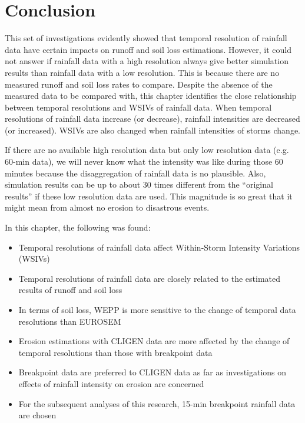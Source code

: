 \section{Conclusion}
\label{sec:TemporalScalesConclusion}

This set of investigations evidently showed that temporal resolution of rainfall
data have certain impacts on runoff and soil loss estimations. However, it could
not answer if rainfall data with a high resolution always give better simulation
results than rainfall data with a low resolution. This is because there are
no measured runoff and soil loss rates to compare. Despite the absence of the
measured data to be compared with, this chapter identifies the close
relationship between temporal resolutions and WSIVs of rainfall data. When
temporal resolutions of rainfall data increase (or decrease), rainfall
intensities are decreased (or increased). WSIVs are also changed when rainfall
intensities of storms change.

If there are no available high resolution data but only low resolution
data (e.g. 60-min data), we will never know what the intensity was like
during those 60 minutes because the disaggregation of rainfall data is no
plausible. Also, simulation results can be up to about 30 times different from
the ``original results'' if these low resolution data are used. This magnitude
is so great that it might mean from almost no erosion to disastrous events.

In this chapter, the following was found:
\begin{itemize}
  \item Temporal resolutions of rainfall data affect Within-Storm Intensity
Variations (WSIVs)
  \item Temporal resolutions of rainfall data are closely related to the
estimated
results of runoff and soil loss
  \item In terms of soil loss, WEPP is more sensitive to the change of temporal
data resolutions than EUROSEM
  \item Erosion estimations with CLIGEN data are more affected by the change of
temporal resolutions than those with breakpoint data
  \item Breakpoint data are preferred to CLIGEN data as far as investigations
on effects of rainfall intensity on erosion are concerned
  \item For the subsequent analyses of this research, 15-min breakpoint rainfall
data are chosen
\end{itemize}


